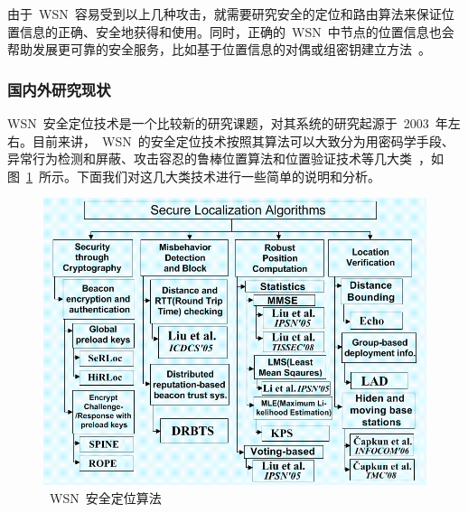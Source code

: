 \documentclass[a4paper,10pt]{article}
\begin{document}
由于~WSN~容易受到以上几种攻击，就需要研究安全的定位和路由算法来保证位置信息的正确、安全地获得和使用。同时，正确的~WSN~中节点的位置信息也会帮助发展更可靠的安全服务，比如基于位置信息的对偶或组密钥建立方法~\cite{Liu2003,Huang2004}。

\subsubsection{国内外研究现状}  

WSN~安全定位技术是一个比较新的研究课题，对其系统的研究起源于~2003~年左右。目前来讲，~WSN~的安全定位技术按照其算法可以大致分为用密码学手段、异常行为检测和屏蔽、攻击容忍的鲁棒位置算法和位置验证技术等几大类~\cite{Boukerche2008}，如图~\ref{wsn_sec_pos}~所示。下面我们对这几大类技术进行一些简单的说明和分析。

\begin{figure}[htbp]
  \centering
  \includegraphics[width=.9\textwidth,keepaspectratio]{wsn_sec_pos}
  \caption{\label{wsn_sec_pos}~WSN~安全定位算法}
\end{figure}
\end{document}
